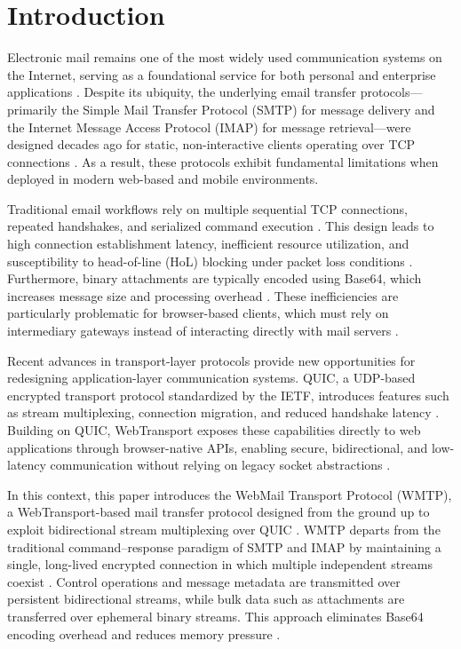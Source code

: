\documentclass[10pt,a4paper]{article}
\begin{document}
\section{Introduction}

Electronic mail remains one of the most widely used communication systems on the Internet, serving as a foundational service for both personal and enterprise applications \cite{smtp,imap,base64}. Despite its ubiquity, the underlying email transfer protocols—primarily the Simple Mail Transfer Protocol (SMTP) for message delivery and the Internet Message Access Protocol (IMAP) for message retrieval—were designed decades ago for static, non-interactive clients operating over TCP connections \cite{smtp,imap}. As a result, these protocols exhibit fundamental limitations when deployed in modern web-based and mobile environments.

Traditional email workflows rely on multiple sequential TCP connections, repeated handshakes, and serialized command execution \cite{smtp}. This design leads to high connection establishment latency, inefficient resource utilization, and susceptibility to head-of-line (HoL) blocking under packet loss conditions \cite{quic}. Furthermore, binary attachments are typically encoded using Base64, which increases message size and processing overhead \cite{base64}. These inefficiencies are particularly problematic for browser-based clients, which must rely on intermediary gateways instead of interacting directly with mail servers \cite{jmap}.

Recent advances in transport-layer protocols provide new opportunities for redesigning application-layer communication systems. QUIC, a UDP-based encrypted transport protocol standardized by the IETF, introduces features such as stream multiplexing, connection migration, and reduced handshake latency \cite{quic}. Building on QUIC, WebTransport exposes these capabilities directly to web applications through browser-native APIs, enabling secure, bidirectional, and low-latency communication without relying on legacy socket abstractions \cite{webtransport,http3}.

In this context, this paper introduces the WebMail Transport Protocol (WMTP), a WebTransport-based mail transfer protocol designed from the ground up to exploit bidirectional stream multiplexing over QUIC \cite{quic,webtransport}. WMTP departs from the traditional command–response paradigm of SMTP and IMAP by maintaining a single, long-lived encrypted connection in which multiple independent streams coexist \cite{smtp,quic}. Control operations and message metadata are transmitted over persistent bidirectional streams, while bulk data such as attachments are transferred over ephemeral binary streams. This approach eliminates Base64 encoding overhead and reduces memory pressure \cite{base64}.
\end{document}
